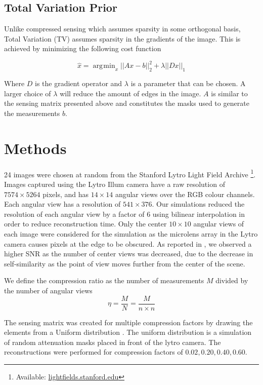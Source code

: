 \documentclass[10pt,twocolumn,letterpaper]{article}
\DeclareMathOperator*{\argmin}{\arg\!\min}
\begin{document}
\subsection{Total Variation Prior}

Unlike compressed sensing which assumes sparsity in some orthogonal basis, Total Variation (TV) assumes sparsity in the gradients of the image. This is achieved by minimizing the following cost function

\[ \hat{x} = \argmin_x ||Ax - b||^2_2 + \lambda ||D x||_1 \]

Where $D$ is the gradient operator and $\lambda$ is a parameter that can be chosen. A larger choice of $\lambda$ will reduce the amount of edges in the image. $A$ is similar to the sensing matrix presented above and constitutes the masks used to generate the measurements $b$.

\section{Methods}

24 images were chosen at random from the Stanford Lytro Light Field Archive \footnote{Available: \url{lightfields.stanford.edu}}. Images captured using the Lytro Illum camera have a raw resolution of $7574 \times 5264$ pixels, and has $14 \times 14$ angular views over the RGB colour channels. Each angular view has a resolution of $541 \times 376$. Our simulations reduced the resolution of each angular view by a factor of $6$ using bilinear interpolation in order to reduce reconstruction time. Only the center $10 \times 10$ angular views of each image were considered for the simulation as the microlens array in the Lytro camera causes pixels at the edge to be obscured. As reported in \cite{mainP1}, we observed a higher SNR as the number of center views was decreased, due to the decrease in self-similarity as the point of view moves further from the center of the scene.


We define the compression ratio as the number of measurements $M$ divided by the number of angular views \[ \eta = \frac{M}{N} = \frac{M}{n \times n}\]

The sensing matrix was created for multiple compression factors by drawing the elements from a Uniform distribution \cite{Rauhut11}. The uniform distribution is a simulation of random attenuation masks placed in front of the lytro camera. The reconstructions were performed for compression factors of $0.02, 0.20, 0.40, 0.60$.
\end{document}
